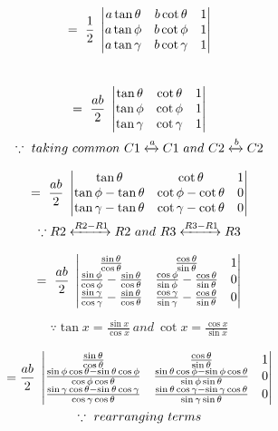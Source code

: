 \documentclass[journal,12pt,twocolumn]{IEEEtran}
\begin{document}
\begin{multline}
=~\frac{1}{2}~\begin{vmatrix}
 a\tan\theta & b\cot\theta & 1  \\ 
 a\tan\phi & b\cot\phi & 1  \\
 a\tan\gamma & b\cot\gamma & 1 
\end{vmatrix}\end{multline}\\
\begin{multline}
=~\frac{ab}{2}~\begin{vmatrix}
 \tan\theta & \cot\theta & 1  \\ 
 \tan\phi &   \cot\phi & 1  \\
 \tan\gamma & \cot\gamma & 1 
\end{vmatrix}\\
\because~taking~ common ~ C1 \xleftrightarrow{{a}} C1  ~and~ C2 \xleftrightarrow{{b}} C2
\end{multline}

\begin{multline}
=~\frac{ab}{2}~\begin{vmatrix}
 \tan\theta & \cot\theta & 1  \\ 
 \tan\phi-\tan\theta & \cot\phi-\cot\theta & 0  \\
 \tan\gamma-\tan\theta & \cot\gamma-\cot\theta & 0 
\end{vmatrix}\\
\because R2 \xleftrightarrow{{R2-R1}} R2  ~and~ R3 \xleftrightarrow{{R3-R1}} R3
\end{multline}


\begin{multline}
=~\frac{ab}{2}~\begin{vmatrix}
 \frac{\sin\theta}{\cos\theta} & \frac{\cos\theta}{\sin\theta} & 1  \\ 
 \frac{\sin\phi}{\cos\phi}-\frac{\sin\theta}{\cos\theta} & \frac{\cos\phi}{\sin\phi}-\frac{\cos\theta}{\sin\theta} & 0  \\
 \frac{\sin\gamma}{\cos\gamma}-\frac{\sin\theta}{\cos\theta} & \frac{\cos\gamma}{\sin\gamma}-\frac{\cos\theta}{\sin\theta} & 0 
\end{vmatrix}\end{multline}
\begin{align*}
\because \tan x = \frac{\sin x}{\cos x}~and~\cot x = \frac{\cos x}{\sin x} \end{align*}

\begin{multline}
=\frac{ab}{2}~\begin{vmatrix}
 \frac{\sin\theta}{\cos\theta} & \frac{\cos\theta}{\sin\theta} & 1  \\ 
 \frac{\sin\phi\cos\theta - \sin\theta\cos\phi}{\cos\phi\cos\theta} & \frac{\sin\theta\cos\phi - \sin\phi\cos\theta}{\sin\phi\sin\theta} & 0  \\
  \frac{\sin\gamma\cos\theta - \sin\theta\cos\gamma}{\cos\gamma\cos\theta} & \frac{\sin\theta\cos\gamma - \sin\gamma\cos\theta}{\sin\gamma\sin\theta} & 0
\end{vmatrix}\\   
\because ~rearranging ~terms 
\end{multline}
\end{document}

